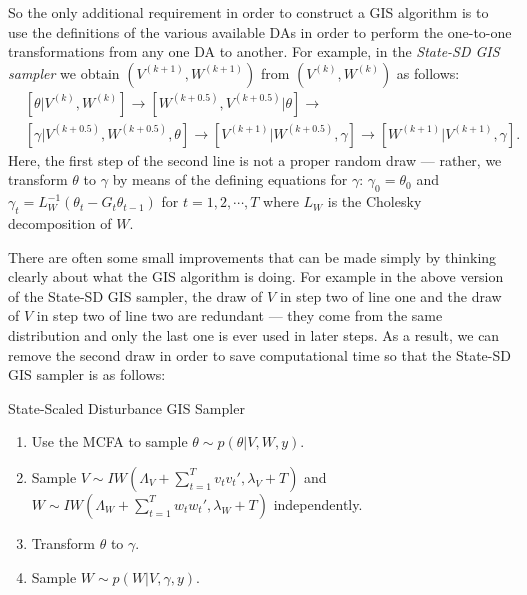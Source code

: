 \documentclass[12pt]{article}
\begin{document}
So the only additional requirement in order to construct a GIS algorithm is to use the definitions of the various available DAs in order to perform the one-to-one transformations from any one DA to another. For example, in the {\it State-SD GIS sampler} we obtain $(V^{(k+1)},W^{(k+1)})$ from $(V^{(k)},W^{(k)})$ as follows:
\begin{align*}
&[\theta|V^{(k)},W^{(k)}] \to [W^{(k+0.5)},V^{(k+0.5)}|\theta] \to\\
&[\gamma|V^{(k+0.5)},W^{(k+0.5)},\theta] \to [V^{(k+1)}|W^{(k+0.5)},\gamma] \to [W^{(k+1)}|V^{(k+1)},\gamma].
\end{align*}
Here, the first step of the second line is not a proper random draw --- rather, we transform $\theta$ to $\gamma$ by means of the defining equations for $\gamma$: $\gamma_0=\theta_0$ and $\gamma_t = L_W^{-1}(\theta_t - G_t\theta_{t-1})$ for $t=1,2,\cdots,T$ where $L_W$ is the Cholesky decomposition of $W$.

There are often some small improvements that can be made simply by thinking clearly about what the GIS algorithm is doing. For example in the above version of the State-SD GIS sampler, the draw of $V$ in step two of line one and the draw of $V$ in step two of line two are redundant --- they come from the same distribution and only the last one is ever used in later steps. As a result, we can remove the second draw in order to save computational time so that the State-SD GIS sampler is as follows:
\begin{alg*}[S-SD GIS]State-Scaled Disturbance GIS Sampler
\label{alg:DLMstateerror}
\begin{enumerate}
\item Use the MCFA to sample $\theta \sim p(\theta|V,W,y)$.
\item Sample $V \sim IW\left(\Lambda_V + \sum_{t=1}^Tv_tv_t',\lambda_V + T\right)$ and $W \sim IW\left(\Lambda_W + \sum_{t=1}^Tw_tw_t',\lambda_{W} + T\right)$ independently.
\item Transform $\theta$ to $\gamma$.
\item Sample $W \sim p(W|V,\gamma,y)$.
\end{enumerate}
\end{alg*}\noindent
\end{document}
